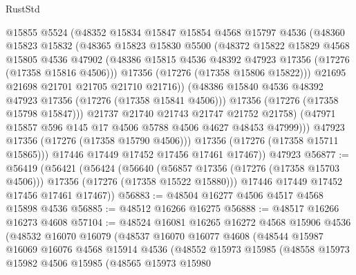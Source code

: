 \begin{lexlean}{RustStd}
\begin{coremodule}
                  @15855
                  @5524
                  (@48352
                    @15834
                    @15847
                    @15854
                    @4568
                    @15797
                    @4536
                    (@48360
                      @15823
                      @15832
                      (@48365
                        @15823
                        @15830
                        @5500
                        (@48372
                          @15822
                          @15829
                          @4568
                          @15805
                          @4536
                          @47902
                          (@48386 @15815 @4536 @48392 @47923 @17356 (@17276 (@17358 @15816 @4506)))
                          @17356
                          (@17276 (@17358 @15806 @15822)))
                        @21695
                        @21698
                        @21701
                        @21705
                        @21710
                        @21716))
                    (@48386 @15840 @4536 @48392 @47923 @17356 (@17276 (@17358 @15841 @4506)))
                    @17356
                    (@17276 (@17358 @15798 @15847)))
                  @21737
                  @21740
                  @21743
                  @21747
                  @21752
                  @21758)
                (@47971 @15857 @596 @145 @17 @4506 @5788 @4506 @4627 @48453 @47999)))
            @47923
            @17356
            (@17276 (@17358 @15790 @4506)))
          @17356
          (@17276 (@17358 @15711 @15865)))
        @17446
        @17449
        @17452
        @17456
        @17461
        @17467))
    @47923
@56877 := @56419
    (@56421
      (@56424
        (@56640
          (@56857 @17356 (@17276 (@17358 @15703 @4506)))
          @17356
          (@17276 (@17358 @15522 @15880)))
        @17446
        @17449
        @17452
        @17456
        @17461
        @17467))
@56883 := @48504 @16277 @4506 @4517 @4568 @15898 @4536
@56885 := @48512 @16266 @16275
@56888 := @48517 @16266 @16273 @4608
@57104 := @48524
    @16081
    @16265
    @16272
    @4568
    @15906
    @4536
    (@48532
      @16070
      @16079
      (@48537
        @16070
        @16077
        @4608
        (@48544
          @15987
          @16069
          @16076
          @4568
          @15914
          @4536
          (@48552
            @15973
            @15985
            (@48558
              @15973
              @15982
              @4506
              @15985
              (@48565
                @15973
                @15980

\end{coremodule}
\end{lexlean}
